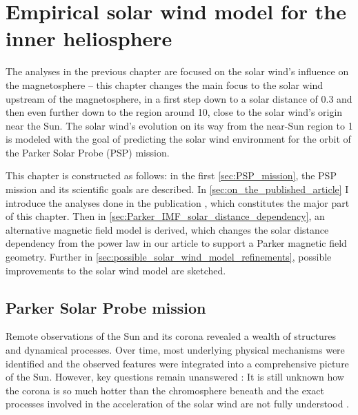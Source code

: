 
\chapter{Empirical solar wind model for the inner heliosphere}
\label{chap:empirical_solar_wind_model_for_the_inner_heliosphere}

The analyses in the previous chapter are focused on the solar wind's influence on the magnetosphere -- this chapter changes the main focus to the solar wind upstream of the magnetosphere, in a first step down to a solar distance of \SI{0.3}{\au} and then even further down to the region around \SI{10}{\Rs}, close to the solar wind's origin near the Sun. The solar wind's evolution on its way from the near-Sun region to \SI{1}{\au} is modeled with the goal of predicting the solar wind environment for the orbit of the Parker Solar Probe (PSP) mission.


This chapter is constructed as follows: in the first \autoref{sec:PSP_mission}, the PSP mission and its scientific goals are described. In \autoref{sec:on_the_published_article} I introduce the analyses done in the publication \citet{Venzmer2018}, which constitutes the major part of this chapter. Then in \autoref{sec:Parker_IMF_solar_distance_dependency}, an alternative magnetic field model is derived, which changes the solar distance dependency from the power law in our article to support a Parker magnetic field geometry. Further in \autoref{sec:possible_solar_wind_model_refinements}, possible improvements to the solar wind model are sketched.


\section{Parker Solar Probe mission}
\label{sec:PSP_mission}
Remote observations of the Sun and its corona revealed a wealth of structures and dynamical processes. Over time, most underlying physical mechanisms were identified and the observed features were integrated into a comprehensive picture of the Sun. However, key questions remain unanswered \citep{McComas2007}: It is still unknown how the corona is so much hotter than the chromosphere beneath \citep{Klimchuk2006} and the exact processes involved in the acceleration of the solar wind are not fully understood \citep{Hollweg1985,Cranmer2017}.

